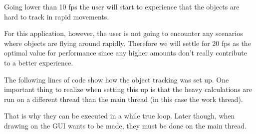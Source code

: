 Going lower than 10 fps the user will start to experience that the objects are hard to track 
in rapid movements.

For this application, however, the user is not going to encounter any scenarios where 
objects are flying around rapidly. Therefore we will settle for 20 fps as the optimal value 
for performance since any higher amounts don't really contribute to a better experience.

The following lines of code show how the object tracking was set up. One important thing to realize when setting this up is that the heavy calculations are run on a different thread than the main thread (in this case the work thread). 

That is why they can be executed in a while true loop. Later though, when drawing on the GUI wants to be made, they must be done on the main thread.

